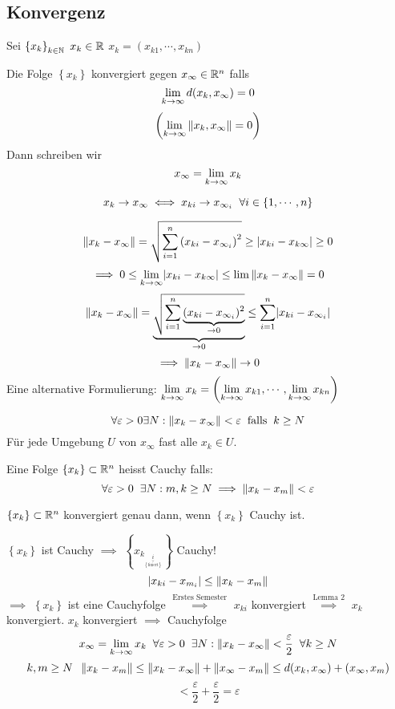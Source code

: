 \subsection{Konvergenz}
Sei $\left\{ x_k \right\}_{k\in\mathbb{N}}$ $x_k\in\mathbb{R}$ $x_k=\left( x_{k1}, \cdots, x_{kn} \right)$
\begin{Def}
  Die Folge $\left\{ x_k \right\}$ konvergiert gegen $x_\infty\in\mathbb{R}^n$ falls
  \[\displaystyle\lim_{k\rightarrow\infty}d(x_k,x_\infty)=0\]
  \[\left( \displaystyle\lim_{k\rightarrow\infty}\left\| x_k,x_\infty \right\|=0 \right)\]
  Dann schreiben wir
  \[x_\infty=\displaystyle\lim_{k\rightarrow\infty}x_k\]
\end{Def}
\begin{Sat}
  \[x_k\rightarrow x_\infty\iff x_{ki}\rightarrow x_{\infty_i}\hspace{2mm}\forall i\in\left\{ 1,\cdots,n \right\}\]
\end{Sat}
\begin{Bew}
  \[\left\| x_k - x_\infty \right\|=\sqrt{\sum_{i=1}^n\left( x_{ki}-x_{\infty_i} \right)^2}\geq \mathopen| x_{ki}-x_{k\infty} \mathclose|\geq 0\]
  \[\implies 0\leq \displaystyle\lim_{k\rightarrow\infty}\mathopen| x_{ki}-x_{k\infty} \mathclose|\leq \lim\left\| x_k-x_\infty \right\|=0\]
  \[\left\| x_k-x_\infty \right\|=\underbrace{\sqrt{\sum_{i=1}^n\underbrace{(x_{ki}-x_{\infty_i})^2}_{\rightarrow 0}}}_{\rightarrow 0}\leq \sum_{i=1}^n\mathopen| x_{ki}-x_{\infty_i} \mathclose|\]
  \[\implies \left\| x_k-x_\infty \right\|\rightarrow 0\]
  Eine alternative Formulierung: $\displaystyle\lim_{k\rightarrow\infty}x_k=\left( \displaystyle\lim_{k\rightarrow\infty} x_{k1},\cdots,\displaystyle\lim_{k\rightarrow\infty} x_{kn} \right)$
\end{Bew}
\begin{Bem}
  \[\forall \varepsilon>0 \exists N: \left\| x_k-x_\infty \right\|<\varepsilon\hspace{2mm}\text{falls}\hspace{2mm} k\geq N\]
  Für jede Umgebung $U$ von $x_\infty$ fast alle $x_k\in U$.
\end{Bem}
\begin{Def}
  Eine Folge $\left\{ x_k \right\}\subset\mathbb{R}^n$ heisst Cauchy falls:
  \[\forall \varepsilon>0\hspace{2mm}\exists N: m,k\geq N\implies \left\| x_k-x_m \right\|<\varepsilon\]
\end{Def}
\begin{Lem}
  $\left\{ x_k \right\}\subset\mathbb{R}^n$ konvergiert genau dann, wenn $\left\{ x_k \right\}$ Cauchy ist.
\end{Lem}
\begin{Bew}
  $\left\{ x_k \right\}$ ist Cauchy $\implies$ $\left\{ x_{k_{\underbrace{i}_{\left\{ \text{fixiert} \right\}}}} \right\}$ Cauchy!
  \[\mathopen| x_{ki}-x_{m_i} \mathclose|\leq\left\| x_k-x_m \right\|\]
  $\implies$ $\left\{ x_k \right\}$ ist eine Cauchyfolge $\stackrel{\text{Erstes Semester}}{\implies}$ $x_{ki}$ konvergiert $\stackrel{\text{Lemma 2}}{\implies}$ $x_k$ konvergiert. $x_k$ konvergiert $\implies$ Cauchyfolge
  \[x_\infty=\displaystyle\lim_{k\rightarrow\infty} x_k\hspace{2mm}\forall \varepsilon>0\hspace{2mm}\exists N:\left\| x_k-x_\infty \right\|<\frac{\varepsilon}{2}\hspace{2mm}\forall k\geq N\]
  \[k,m\geq N\hspace{2mm} \left\| x_k-x_m \right\|\leq \left\| x_k-x_\infty \right\|+\left\| x_\infty-x_m \right\|\leq d(x_k,x_\infty)+(x_\infty,x_m)\]
  \[<\frac{\varepsilon}{2}+\frac{\varepsilon}{2}=\varepsilon\]
\end{Bew}
